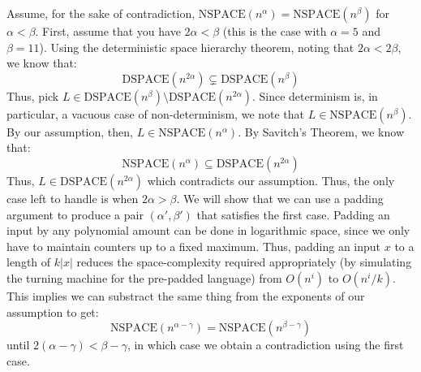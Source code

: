 \documentclass[12pt]{article}
\begin{document}
\begin{solution}
    Assume, for the sake of contradiction, $\text{NSPACE}(n^\alpha) = \text{NSPACE}(n^\beta)$ for $\alpha < \beta$. \bbni
    First, assume that you have $2\alpha < \beta$ (this is the case with $\alpha = 5$ and $\beta = 11$). Using the deterministic space hierarchy theorem, noting that $2\alpha < 2 \beta$, we know that:
    \[\text{DSPACE}(n^{2\alpha}) \subsetneq \text{DSPACE}(n^{\beta}) \]
    Thus, pick $L \in \text{DSPACE}(n^\beta) \setminus \text{DSPACE}(n^{2\alpha})$. Since determinism is, in particular, a vacuous case of non-determinism, we note that $L \in \text{NSPACE}(n^\beta)$. By our assumption, then, $L \in \text{NSPACE}(n^\alpha)$. By Savitch's Theorem, we know that: 
    \[ \text{NSPACE}(n^\alpha) \subseteq \text{DSPACE}(n^{2\alpha})\]
    Thus, $L \in \text{DSPACE}(n^{2\alpha})$ which contradicts our assumption. \bbni
    Thus, the only case left to handle is when $2 \alpha > \beta$. We will show that we can use a padding argument to produce a pair $(\alpha', \beta')$ that satisfies the first case. \bbni
    Padding an input by any polynomial amount can be done in logarithmic space, since we only have to maintain counters up to a fixed maximum. Thus, padding an input $x$ to a length of $k|x|$ reduces the space-complexity required appropriately (by simulating the turning machine for the pre-padded language) from $O(n^i)$ to $O(n^{i}/k)$. This implies we can substract the same thing from the exponents of our assumption to get: 
    \[    \text{NSPACE}(n^{\alpha-\gamma}) = \text{NSPACE}(n^{\beta-\gamma}) \]
    until $2(\alpha-\gamma) < \beta-\gamma$, in which case we obtain a contradiction using the first case.


\end{solution}
\end{document}
